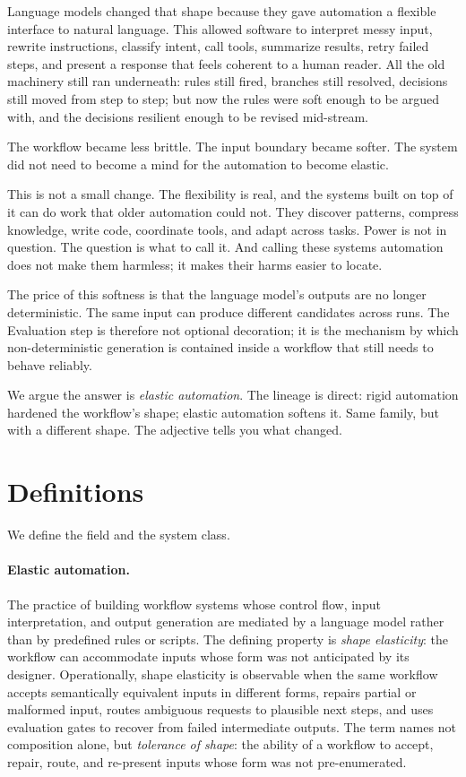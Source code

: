 \documentclass[11pt,a4paper]{article}
\begin{document}
Language models changed that shape because they gave automation a flexible interface to natural language. This allowed software to interpret messy input, rewrite instructions, classify intent, call tools, summarize results, retry failed steps, and present a response that feels coherent to a human reader. All the old machinery still ran underneath: rules still fired, branches still resolved, decisions still moved from step to step; but now the rules were soft enough to be argued with, and the decisions resilient enough to be revised mid-stream.

The workflow became less brittle. The input boundary became softer. The system did not need to become a mind for the automation to become elastic.

This is not a small change. The flexibility is real, and the systems built on top of it can do work that older automation could not. They discover patterns, compress knowledge, write code, coordinate tools, and adapt across tasks. Power is not in question. The question is what to call it. And calling these systems automation does not make them harmless; it makes their harms easier to locate.

The price of this softness is that the language model's outputs are no longer deterministic. The same input can produce different candidates across runs. The Evaluation step is therefore not optional decoration; it is the mechanism by which non-deterministic generation is contained inside a workflow that still needs to behave reliably.

We argue the answer is \textit{elastic automation}. The lineage is direct: rigid automation hardened the workflow's shape; elastic automation softens it. Same family, but with a different shape. The adjective tells you what changed.

\section{Definitions}\label{sec:definitions}

We define the field and the system class.

\paragraph{Elastic automation.} The practice of building workflow systems whose control flow, input interpretation, and output generation are mediated by a language model rather than by predefined rules or scripts. The defining property is \textit{shape elasticity}: the workflow can accommodate inputs whose form was not anticipated by its designer. Operationally, shape elasticity is observable when the same workflow accepts semantically equivalent inputs in different forms, repairs partial or malformed input, routes ambiguous requests to plausible next steps, and uses evaluation gates to recover from failed intermediate outputs. The term names not composition alone, but \textit{tolerance of shape}: the ability of a workflow to accept, repair, route, and re-present inputs whose form was not pre-enumerated.
\end{document}
